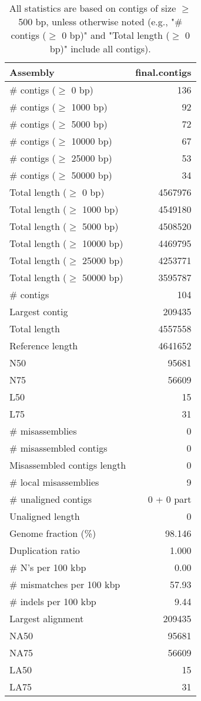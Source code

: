 \documentclass[12pt,a4paper]{article}
\begin{document}
\begin{table}[ht]
\begin{center}
\caption{All statistics are based on contigs of size $\geq$ 500 bp, unless otherwise noted (e.g., "\# contigs ($\geq$ 0 bp)" and "Total length ($\geq$ 0 bp)" include all contigs).}
\begin{tabular}{|l*{1}{|r}|}
\hline
Assembly & final.contigs \\ \hline
\# contigs ($\geq$ 0 bp) & 136 \\ \hline
\# contigs ($\geq$ 1000 bp) & 92 \\ \hline
\# contigs ($\geq$ 5000 bp) & 72 \\ \hline
\# contigs ($\geq$ 10000 bp) & 67 \\ \hline
\# contigs ($\geq$ 25000 bp) & 53 \\ \hline
\# contigs ($\geq$ 50000 bp) & 34 \\ \hline
Total length ($\geq$ 0 bp) & 4567976 \\ \hline
Total length ($\geq$ 1000 bp) & 4549180 \\ \hline
Total length ($\geq$ 5000 bp) & 4508520 \\ \hline
Total length ($\geq$ 10000 bp) & 4469795 \\ \hline
Total length ($\geq$ 25000 bp) & 4253771 \\ \hline
Total length ($\geq$ 50000 bp) & 3595787 \\ \hline
\# contigs & 104 \\ \hline
Largest contig & 209435 \\ \hline
Total length & 4557558 \\ \hline
Reference length & 4641652 \\ \hline
N50 & 95681 \\ \hline
N75 & 56609 \\ \hline
L50 & 15 \\ \hline
L75 & 31 \\ \hline
\# misassemblies & 0 \\ \hline
\# misassembled contigs & 0 \\ \hline
Misassembled contigs length & 0 \\ \hline
\# local misassemblies & 9 \\ \hline
\# unaligned contigs & 0 + 0 part \\ \hline
Unaligned length & 0 \\ \hline
Genome fraction (\%) & 98.146 \\ \hline
Duplication ratio & 1.000 \\ \hline
\# N's per 100 kbp & 0.00 \\ \hline
\# mismatches per 100 kbp & 57.93 \\ \hline
\# indels per 100 kbp & 9.44 \\ \hline
Largest alignment & 209435 \\ \hline
NA50 & 95681 \\ \hline
NA75 & 56609 \\ \hline
LA50 & 15 \\ \hline
LA75 & 31 \\ \hline
\end{tabular}
\end{center}
\end{table}
\end{document}
